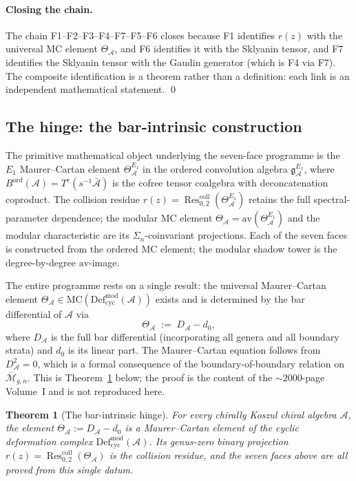 \documentclass[11pt]{article}
\theoremstyle{plain}
\newtheorem{theorem}{Theorem}[section]
\theoremstyle{definition}
\theoremstyle{remark}
\newcommand{\Defcyc}{\mathrm{Def}_{\mathrm{cyc}}}
\newcommand{\Mbar}{\overline{\mathcal{M}}}
\newcommand{\MC}{\mathrm{MC}}
\newcommand{\cA}{\mathcal{A}}
\newcommand{\Res}{\operatorname{Res}}
\begin{document}
\paragraph{Closing the chain.}
The chain F1--F2--F3--F4--F7--F5--F6 closes because F1 identifies
$r(z)$ with the universal MC element $\Theta_{\cA}$, and F6 identifies
it with the Sklyanin tensor, and F7 identifies the Sklyanin tensor
with the Gaudin generator (which is F4 via F7). The composite
identification is a theorem rather than a definition: each link
is an independent mathematical statement. \qed

\subsection{The hinge: the bar-intrinsic construction}

The primitive mathematical object underlying the seven-face programme
is the $E_1$ Maurer--Cartan element
$\Theta^{E_1}_{\cA}$ in the ordered convolution algebra
$\mathfrak{g}^{E_1}_\cA$,
where $B^{\mathrm{ord}}(\cA) = T^c(s^{-1}\bar{\cA})$ is the cofree
tensor coalgebra with deconcatenation coproduct. The collision
residue $r(z) = \Res^{\mathrm{coll}}_{0,2}(\Theta^{E_1}_\cA)$ retains
the full spectral-parameter dependence; the modular MC element
$\Theta_\cA = \mathrm{av}(\Theta^{E_1}_\cA)$ and the modular
characteristic are its
$\Sigma_n$-coinvariant projections. Each of the seven faces
is constructed from the ordered MC element; the modular shadow tower
is the degree-by-degree $\mathrm{av}$-image.

The entire programme rests on a single result: the
universal Maurer--Cartan element
$\Theta_{\cA}\in\MC(\Defcyc^{\mathrm{mod}}(\cA))$ exists and is
determined by the bar differential of $\cA$ via
\[
 \Theta_{\cA} \;:=\; D_{\cA} - d_0,
\]
where $D_{\cA}$ is the full bar differential (incorporating all
genera and all boundary strata) and $d_0$ is its linear part.
The Maurer--Cartan equation follows from $D_{\cA}^2=0$, which is a
formal consequence of the boundary-of-boundary relation on
$\Mbar_{g,n}$. This is
Theorem~\ref{thm:bar-intrinsic-hinge} below; the proof is the
content of the $\sim 2000$-page Volume~I and is not reproduced
here.

\begin{theorem}[The bar-intrinsic hinge]\label{thm:bar-intrinsic-hinge}
For every chirally Koszul chiral algebra $\cA$, the element
$\Theta_{\cA}:=D_{\cA}-d_0$ is a Maurer--Cartan element of the
cyclic deformation complex $\Defcyc^{\mathrm{mod}}(\cA)$. Its
genus-zero binary projection
$r(z)=\Res^{\mathrm{coll}}_{0,2}(\Theta_{\cA})$ is the collision
residue, and the seven faces above are all proved from this
single datum.
\end{theorem}
\end{document}
